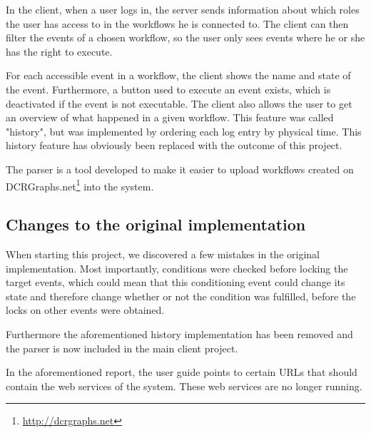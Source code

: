 		\newpar In the client, when a user logs in, the server sends information about which roles the user has access to in the workflows he is connected to. The client can then filter the events of a chosen workflow, so the user only sees events where he or she has the right to execute.
		
		For each accessible event in a workflow, the client shows the name and state of the event. Furthermore, a button used to execute an event exists, which is deactivated if the event is not executable. The client also allows the user to get an overview of what happened in a given workflow. This feature was called "history", but was implemented by ordering each log entry by physical time. This history feature has obviously been replaced with the outcome of this project.
		
		\newpar The parser is a tool developed to make it easier to upload workflows created on DCRGraphs.net\footnote{\url{http://dcrgraphs.net}} into the system.
		
		\subsection{Changes to the original implementation}
			When starting this project, we discovered a few mistakes in the original implementation. Most importantly, conditions were checked before locking the target events, which could mean that this conditioning event could change its state and therefore change whether or not the condition was fulfilled, before the locks on other events were obtained.
            
            Furthermore the aforementioned history implementation has been removed and the parser is now included in the main client project.

			\newpar In the aforementioned report, the user guide points to certain URLs that should contain the web services of the system. These web services are no longer running.